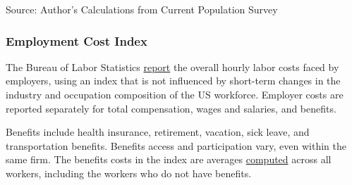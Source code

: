 \documentclass{report}
\makeatletter
\newcommand{\tbllink}[1]{\href{https://raw.githubusercontent.com/bdecon/US-chartbook/master/chartbook/data/#1}{\faTable}}
\newcommand*\short[1]{\expandafter\@gobbletwo\number\numexpr#1\relax}
\newcommand{\absnode}[3]{\node[below right, align=left] at (axis cs: #1,#2) {#3};}
\newcommand{\dateaxisticks}{
		date coordinates in=x, axis line style={draw=none},
		xmax={2023-02-15},
		max space between ticks=40,	    
		xtick={{1990-01-01}, {1992-01-01}, {1994-01-01}, 
			{1996-01-01}, {1998-01-01}, {2000-01-01}, 
			{2002-01-01}, {2004-01-01}, {2006-01-01},
			{2008-01-01}, {2010-01-01}, {2012-01-01}, {2014-01-01},
		    {2016-01-01}, {2018-01-01}, {2020-01-01}, {2022-01-01}, 
		    {2024-01-01}, {2026-01-01}},
		minor xtick={{1989-01-01}, {1991-01-01}, {1993-01-01},
			{1995-01-01}, {1997-01-01}, {1999-01-01}, 
			{2001-01-01}, {2003-01-01}, {2005-01-01}, {2007-01-01},
		    {2009-01-01}, {2011-01-01}, {2013-01-01}, {2015-01-01},
		    {2017-01-01}, {2019-01-01}, {2021-01-01}, {2023-01-01}, 
		    {2025-01-01}, {2027-01-01}},
		enlarge y limits={0.06}, enlarge x limits={0.01},
		}
\newcommand{\thickline}[4]{\addplot[ultra thick, no markers, color=#1] 
		table [x=#2, y=#3, col sep=comma] {#4};	}
\newcommand{\rbars}{
		\fill[color=black!10] (axis cs:{1990-07-01},\pgfkeysvalueof{/pgfplots/ymin}) rectangle 
			(axis cs:{1991-03-01}, \pgfkeysvalueof{/pgfplots/ymax});
		\fill[color=black!10] (axis cs:{2007-12-01},\pgfkeysvalueof{/pgfplots/ymin}) rectangle 
			(axis cs:{2009-07-01}, \pgfkeysvalueof{/pgfplots/ymax});
		\fill[color=black!10] (axis cs:{2001-03-01},\pgfkeysvalueof{/pgfplots/ymin}) rectangle 
			(axis cs:{2001-11-01}, \pgfkeysvalueof{/pgfplots/ymax});
		\fill[color=black!10] (axis cs:{2020-02-01},\pgfkeysvalueof{/pgfplots/ymin}) rectangle 
			(axis cs:{2020-05-01}, \pgfkeysvalueof{/pgfplots/ymax});}
\makeatother
\begin{document}
{\begin{minipage}{0.76\textwidth}
\hspace{7mm} 

\footnotesize{Source: Author's Calculations from Current Population Survey} \hfill \tbllink{educ_wage.csv}
\end{minipage}
\newpage
\begin{minipage}{0.76\textwidth}
\subsubsection*{Employment Cost Index}
\small The Bureau of Labor Statistics \href{https://www.bls.gov/news.release/eci.nr0.htm}{report} the overall hourly labor costs faced by employers, using an index that is not influenced by short-term changes in the industry and occupation composition of the US workforce. Employer costs are reported separately for total compensation, wages and salaries, and benefits.

Benefits include health insurance, retirement, vacation, sick leave, and transportation benefits. Benefits access and participation vary, even within the same firm. The benefits costs in the index are averages \href{https://www.bls.gov/opub/mlr/cwc/benefit-cost-concepts-and-the-limitations-of-ecec-measurement.pdf}{computed} across all workers, including the workers who do not have benefits. 
\end{minipage}

}
\end{document}

